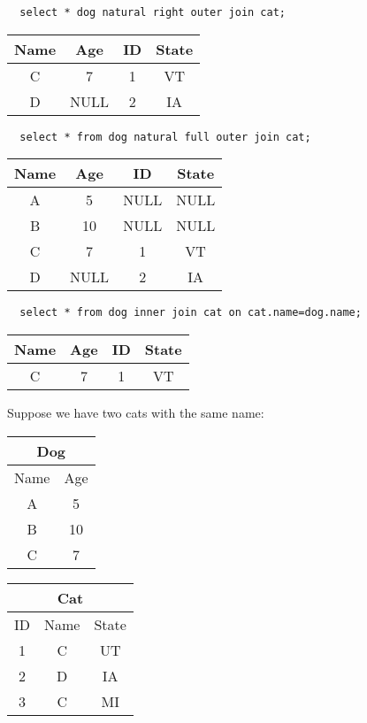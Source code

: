 \documentclass{math}
\begin{document}
\begin{lstlisting}
  select * dog natural right outer join cat;
\end{lstlisting}
\begin{center}
  \begin{tabular}{|c|c|c|c|}
    \hline
    Name & Age & ID & State \\
    \hline
    C & 7 & 1 & VT \\
    D & NULL & 2 & IA \\
    \hline
  \end{tabular}
\end{center}
\begin{lstlisting}
  select * from dog natural full outer join cat;
\end{lstlisting}
\begin{center}
  \begin{tabular}{|c|c|c|c|}
    \hline
    Name & Age & ID & State \\
    \hline
    A & 5 & NULL & NULL \\
    B & 10 & NULL & NULL \\
    C & 7 & 1 & VT \\
    D & NULL & 2 & IA \\
    \hline
  \end{tabular}
\end{center}
\begin{lstlisting}
  select * from dog inner join cat on cat.name=dog.name;
\end{lstlisting}
\begin{center}
  \begin{tabular}{|c|c|c|c|}
    \hline
    Name & Age & ID & State \\
    \hline
    C & 7 & 1 & VT \\
    \hline
  \end{tabular}
\end{center}
Suppose we have two cats with the same name:
\begin{center}
  \begin{tabular}{|c|c|}
    \hline
    \multicolumn{2}{|c|}{Dog} \\
    \hline
    Name & Age \\
    \hline
    A & 5 \\
    B & 10 \\
    C & 7 \\
    \hline
  \end{tabular}
  \begin{tabular}{|c|c|c|}
    \hline
    \multicolumn{3}{|c|}{Cat} \\
    \hline
    ID & Name & State \\
    \hline
    1 & C & UT \\
    2 & D & IA \\
    3 & C & MI \\
    \hline
  \end{tabular}
\end{center}
\end{document}
